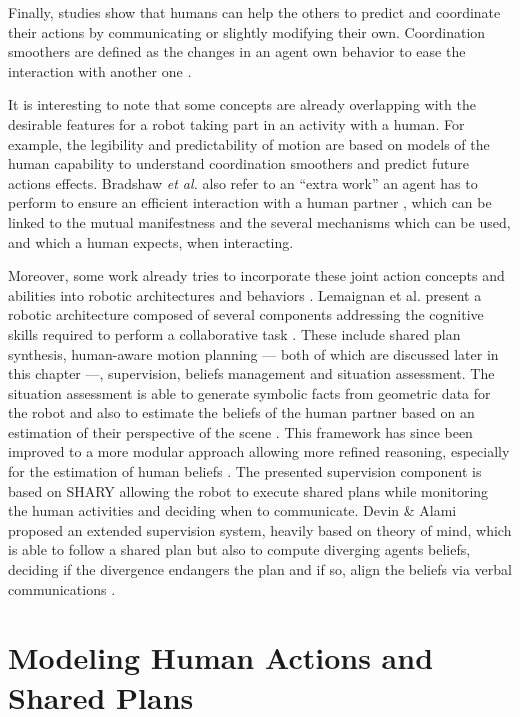 \documentclass[a4paper,11pt,twoside]{StyleThese}
\begin{document}
Finally, studies show that humans can help the others to predict and coordinate their actions by communicating or slightly modifying their own. Coordination smoothers are defined as the changes in an agent own behavior to ease the interaction with another one \cite{vesper_minimal_2010}.

It is interesting to note that some concepts are already overlapping with the desirable features for a robot taking part in an activity with a human. For example, the legibility and predictability of motion are based on models of the human capability to understand coordination smoothers and predict future actions effects. Bradshaw \textit{et al.} also refer to an ``extra work'' an agent has to perform to ensure an efficient interaction with a human partner \cite{bradshaw2003adjustable}, which can be linked to the mutual manifestness and the several mechanisms which can be used, and which a human expects, when interacting.

Moreover, some work already tries to incorporate these joint action concepts and abilities into robotic architectures and behaviors \cite{khamassi2016integration, clodic2017key}. Lemaignan et al. present a robotic architecture composed of several components addressing the cognitive skills required to perform a collaborative task \cite{lemaignan2017artificial}. These include shared plan synthesis, human-aware motion planning --- both of which are discussed later in this chapter ---, supervision, beliefs management and situation assessment. The situation assessment is able to generate symbolic facts from geometric data for the robot and also to estimate the beliefs of the human partner based on an estimation of their perspective of the scene \cite{milliez2014framework}. This framework has since been improved to a more modular approach allowing more refined reasoning, especially for the estimation of human beliefs \cite{lemaignan2018underworlds}. The presented supervision component is based on SHARY \cite{clodic2009shary} allowing the robot to execute shared plans while monitoring the human activities and deciding when to communicate. Devin \& Alami proposed an extended supervision system, heavily based on theory of mind, which is able to follow a shared plan but also to compute diverging agents beliefs, deciding if the divergence endangers the plan and if so, align the beliefs via verbal communications \cite{devin2016implemented}.

\section{Modeling Human Actions and Shared Plans}
\end{document}
